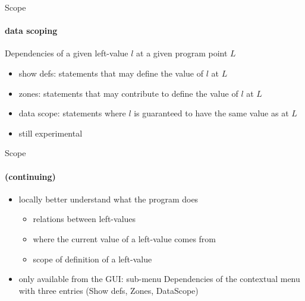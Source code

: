 \documentclass{beamer}
\newcommand{\orange}[1]{{\textcolor{frama-c-1}{#1}}}
\newcommand{\orangepale}[1]{{\textcolor{frama-c-2}{#1}}}
\newcommand{\vvert}[1]{{\textcolor{vert}{#1}}}
\newcommand{\continuing}{\framesubtitle{(continuing)}}
\newcommand{\intro}[1]{\begin{center}\vvert{#1}\end{center}}
\newenvironment{sect}[1]{\orange{#1}\begin{itemize}}{\end{itemize}}
\newenvironment{features}{\begin{sect}{Features}}{\end{sect}}
\newenvironment{whatitisgoodfor}{\begin{sect}{What is it good for}}{\end{sect}}
\newenvironment{howtouse}{\begin{sect}{How to use}}{\end{sect}}
\begin{document}

\begin{frame}{Scope}
\framesubtitle{data scoping}

\intro{Dependencies of a given left-value $l$ at a given program point $L$}

\begin{features}
\item \orangepale{show defs}: statements that may define the value of $l$ at
  $L$
\item \orangepale{zones}: statements that may contribute to define the value of
  $l$ at $L$
\item \orangepale{data scope}: statements where $l$ is guaranteed to have the
  same value as at $L$
\end{features}\medskip

\begin{sect}{Warning}
\item still experimental
\end{sect}

\end{frame}


\begin{frame}{Scope}
\continuing

\begin{whatitisgoodfor}
\item locally better understand what the program does
  \begin{itemize}
  \item relations between left-values
  \item where the current value of a left-value comes from
  \item scope of definition of a left-value
  \end{itemize}
\end{whatitisgoodfor}\medskip

\begin{howtouse}
\item only available from the GUI: sub-menu \orangepale{Dependencies} of the
  contextual menu with three entries (\orangepale{Show defs},
  \orangepale{Zones}, \orangepale{DataScope})
\end{howtouse}

\end{frame}
\end{document}
